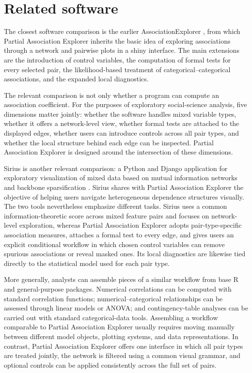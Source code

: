 \documentclass[11pt]{article}
\newcommand{\appname}{Partial Association Explorer}
\newcommand{\pkg}[1]{\textsf{#1}}
\newcommand{\proglang}[1]{\textsf{#1}}
\begin{document}
\section{Related software}
\label{sec:related}

The closest software comparison is the earlier \pkg{AssociationExplorer}
\citep{SoeteweyHeuchenneClaesDescampe2026}, from which \appname{} inherits the
basic idea of exploring associations through a network and pairwise plots in a
\pkg{shiny} interface. The main extensions are the introduction of control
variables, the computation of formal tests for every selected pair, the
likelihood-based treatment of categorical--categorical associations, and the
expanded local diagnostics.

The relevant comparison is not only whether a program can compute an
association coefficient. For the purposes of exploratory social-science
analysis, five dimensions matter jointly: whether the software handles mixed
variable types, whether it offers a network-level view, whether formal tests
are attached to the displayed edges, whether users can introduce controls
across all pair types, and whether the local structure behind each edge can be
inspected. \appname{} is designed around the intersection of these dimensions.

\pkg{Sirius} is another relevant comparison: a Python and Django application
for exploratory visualization of mixed data based on mutual information
networks and backbone sparsification \citep{AdamsEtAl2021}. \pkg{Sirius} shares with
\appname{} the objective of helping users navigate heterogeneous dependence
structures visually. The two tools nevertheless emphasize different tasks.
\pkg{Sirius} uses a common information-theoretic score across mixed feature pairs and
focuses on network-level exploration, whereas \appname{} adopts
pair-type-specific association measures, attaches a formal test to every edge,
and gives users an explicit conditional workflow in which chosen control
variables can remove spurious associations or reveal masked ones. Its local
diagnostics are likewise tied directly to the statistical model used for each
pair type.

More generally, analysts can assemble pieces of a similar workflow from base
\proglang{R} and general-purpose packages. Numerical correlations can be
computed with standard correlation functions; numerical--categorical
relationships can be assessed through linear models or ANOVA; and
contingency-table analyses can be carried out with standard categorical-data
tools. Assembling a workflow comparable to \appname{} usually requires moving
manually between different model objects, plotting systems, and data
representations. In contrast, \appname{} offers one interface in which all pair
types are treated jointly, the network is filtered using a common visual
grammar, and optional controls can be applied consistently across the full set
of pairs.
\end{document}
